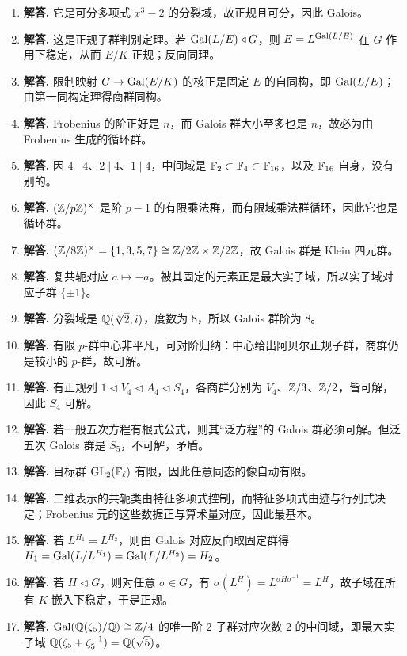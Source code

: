 \begin{enumerate}[label=\textbf{\arabic*.}, leftmargin=*, itemsep=1em]
\item \textbf{解答.} 它是可分多项式 $x^3-2$ 的分裂域，故正规且可分，因此 Galois。
\item \textbf{解答.} 这是正规子群判别定理。若 $\mathrm{Gal}(L/E)\triangleleft G$，则 $E=L^{\mathrm{Gal}(L/E)}$ 在 $G$ 作用下稳定，从而 $E/K$ 正规；反向同理。
\item \textbf{解答.} 限制映射 $G\to \mathrm{Gal}(E/K)$ 的核正是固定 $E$ 的自同构，即 $\mathrm{Gal}(L/E)$；由第一同构定理得商群同构。
\item \textbf{解答.} Frobenius 的阶正好是 $n$，而 Galois 群大小至多也是 $n$，故必为由 Frobenius 生成的循环群。
\item \textbf{解答.} 因 $4\mid4$、$2\mid4$、$1\mid4$，中间域是 $\mathbb{F}_2\subset \mathbb{F}_4\subset \mathbb{F}_{16}$，以及 $\mathbb{F}_{16}$ 自身，没有别的。
\item \textbf{解答.} $(\mathbb{Z}/p\mathbb{Z})^\times$ 是阶 $p-1$ 的有限乘法群，而有限域乘法群循环，因此它也是循环群。
\item \textbf{解答.} $(\mathbb{Z}/8\mathbb{Z})^\times=\{1,3,5,7\}\cong \mathbb{Z}/2\mathbb{Z}\times \mathbb{Z}/2\mathbb{Z}$，故 Galois 群是 Klein 四元群。
\item \textbf{解答.} 复共轭对应 $a\mapsto -a$。被其固定的元素正是最大实子域，所以实子域对应子群 $\{\pm1\}$。
\item \textbf{解答.} 分裂域是 $\mathbb{Q}(\sqrt[4]{2},i)$，度数为 $8$，所以 Galois 群阶为 $8$。
\item \textbf{解答.} 有限 $p$-群中心非平凡，可对阶归纳：中心给出阿贝尔正规子群，商群仍是较小的 $p$-群，故可解。
\item \textbf{解答.} 有正规列 $1\triangleleft V_4\triangleleft A_4\triangleleft S_4$，各商群分别为 $V_4$、$\mathbb{Z}/3$、$\mathbb{Z}/2$，皆可解，因此 $S_4$ 可解。
\item \textbf{解答.} 若一般五次方程有根式公式，则其“泛方程”的 Galois 群必须可解。但泛五次 Galois 群是 $S_5$，不可解，矛盾。
\item \textbf{解答.} 目标群 $\mathrm{GL}_2(\mathbb{F}_\ell)$ 有限，因此任意同态的像自动有限。
\item \textbf{解答.} 二维表示的共轭类由特征多项式控制，而特征多项式由迹与行列式决定；Frobenius 元的这些数据正与算术量对应，因此最基本。
\item \textbf{解答.} 若 $L^{H_1}=L^{H_2}$，则由 Galois 对应反向取固定群得 $H_1=\mathrm{Gal}(L/L^{H_1})=\mathrm{Gal}(L/L^{H_2})=H_2$。
\item \textbf{解答.} 若 $H\triangleleft G$，则对任意 $\sigma\in G$，有 $\sigma(L^H)=L^{\sigma H\sigma^{-1}}=L^H$，故子域在所有 $K$-嵌入下稳定，于是正规。
\item \textbf{解答.} $\mathrm{Gal}(\mathbb{Q}(\zeta_5)/\mathbb{Q})\cong \mathbb{Z}/4$ 的唯一阶 $2$ 子群对应次数 $2$ 的中间域，即最大实子域 $\mathbb{Q}(\zeta_5+\zeta_5^{-1})=\mathbb{Q}(\sqrt5)$。

\end{enumerate}
